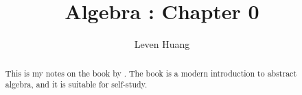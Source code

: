 \documentclass[a4paper]{report}
\author{Leven Huang}
\title{Algebra : Chapter 0}
\begin{document}
\maketitle

\begin{abstract}
	This is my notes on the book  by \citeauthor{paoloaluffi_2009_algebra}. The book is a modern introduction to abstract algebra, and it is suitable for self-study.
\end{abstract}

\newpage

\tableofcontents




\newpage
\appendix
\appendixpage



\newpage
\printbibliography
\end{document}
